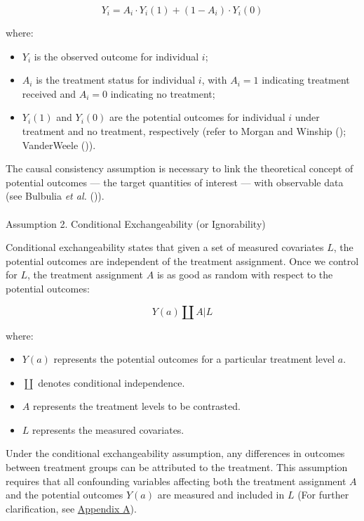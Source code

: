 \documentclass[
  single column]{article}
\makeatletter
\let\oldparagraph\paragraph
\renewcommand{\paragraph}{
    \@ifstar
      \xxxParagraphStar
      \xxxParagraphNoStar
  }
\newcommand{\xxxParagraphStar}[1]{\oldparagraph*{#1}\mbox{}}
\newcommand{\xxxParagraphNoStar}[1]{\oldparagraph{#1}\mbox{}}
\providecommand{\tightlist}{%
  \setlength{\itemsep}{0pt}\setlength{\parskip}{0pt}}\usepackage{longtable,booktabs,array}
\makeatother
\begin{document}
\[
Y_i = A_i \cdot Y_i(1) + (1 - A_i) \cdot Y_i(0)
\]

where:

\begin{itemize}
\tightlist
\item
  \(Y_i\) is the observed outcome for individual \(i\);
\item
  \(A_i\) is the treatment status for individual \(i\), with \(A_i = 1\)
  indicating treatment received and \(A_i = 0\) indicating no treatment;
\item
  \(Y_i(1)\) and \(Y_i(0)\) are the potential outcomes for individual
  \(i\) under treatment and no treatment, respectively (refer to Morgan
  and Winship (); VanderWeele
  ()).
\end{itemize}

The causal consistency assumption is necessary to link the theoretical
concept of potential outcomes --- the target quantities of interest ---
with observable data (see Bulbulia \emph{et al.}
()).

\paragraph{Assumption 2. Conditional Exchangeability (or
Ignorability)}\label{assumption-2.-conditional-exchangeability-or-ignorability}

Conditional exchangeability states that given a set of measured
covariates \(L\), the potential outcomes are independent of the
treatment assignment. Once we control for \(L\), the treatment
assignment \(A\) is as good as random with respect to the potential
outcomes:

\[
Y(a) \coprod A | L
\]

where:

\begin{itemize}
\tightlist
\item
  \(Y(a)\) represents the potential outcomes for a particular treatment
  level \(a\).
\item
  \(\coprod\) denotes conditional independence.
\item
  \(A\) represents the treatment levels to be contrasted.
\item
  \(L\) represents the measured covariates.
\end{itemize}

Under the conditional exchangeability assumption, any differences in
outcomes between treatment groups can be attributed to the treatment.
This assumption requires that all confounding variables affecting both
the treatment assignment \(A\) and the potential outcomes \(Y(a)\) are
measured and included in \(L\) (For further clarification, see
\hyperref[id-app-a]{Appendix A}).
\end{document}
